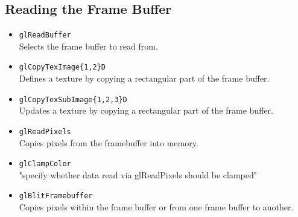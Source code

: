 \documentclass[12pt]{article}
\begin{document}
\subsection{Reading the Frame Buffer}
\begin{itemize}
\item \texttt{glReadBuffer} \\
	Selects the frame buffer to read from.
\item \texttt{glCopyTexImage\{1,2\}D} \\
	Defines a texture by copying a rectangular part of the frame buffer.
\item \texttt{glCopyTexSubImage\{1,2,3\}D} \\
	Updates a texture by copying a rectangular part of the frame buffer.
\item \texttt{glReadPixels} \\
	Copies pixels from the framebuffer into memory.
\item \texttt{glClampColor} \\
	"specify whether data read via glReadPixels should be clamped"
\item \texttt{glBlitFramebuffer} \\
	Copies pixels within the frame buffer or from one frame buffer to another.
\end{itemize}
\end{document}
